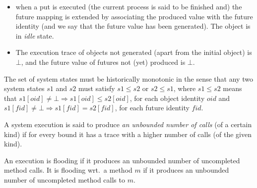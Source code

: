 {\begin{definition}
\begin{itemize}
a state representing the next statement \emph{after} an await of a process $p$
must occur \emph{after} an idle state when the await is enabled (and when it is the next 
state of the process $p$). %
\item when a put is executed (the current process is said to be
  finished and) the future  mapping is extended
by associating the produced
value with the   future identity (and we say that the future value has been
  generated). The object is in \emph{idle} state.
\item The execution trace of objects not generated (apart from the initial object)  is $\bot$,
and the future value of futures not (yet) produced is $\bot$.
\end{itemize}
The set of system states must be historically monotonic
in the sense that any two  system states $s1$ and $s2$ must satisfy $s1\leq s2$ or  $s2\leq s1$,
where $s1\leq s2$ means that 
$s1[oid] \not=\bot  \Rightarrow s1[oid] \leq s2[oid]$, for each object identity $oid$
and $s1[\mathit{fid}] \not=\bot  \Rightarrow s1[\mathit{fid}] =s2[\mathit{fid}]$, for each future identity $\mathit{fid}$.
\end{definition}
%

\begin{definition}\label{def-unbounded}
A  system execution is said to produce \emph{an unbounded number of calls} (of a certain kind)
if for every bound it has a trace with a higher number of  calls (of the given kind).
\end{definition}

\begin{definition}[Flooding]\label{def-flooding-ex}
An execution is flooding if it produces an unbounded number of
uncompleted method calls.
It is flooding wrt.\ a method $m$ if it produces an unbounded number of
uncompleted method calls to  $m$.
\end{definition}


}
